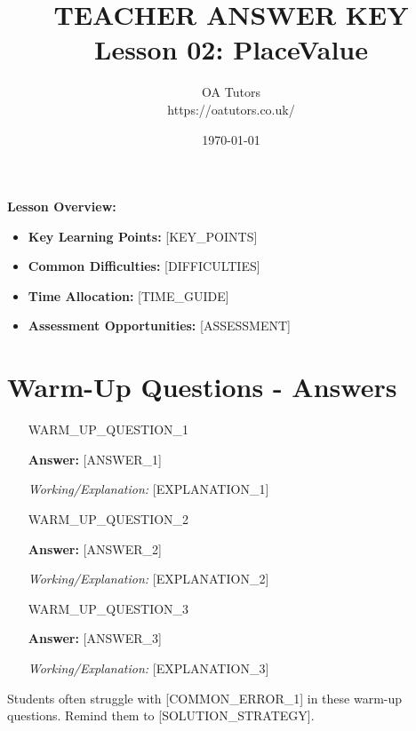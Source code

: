 \documentclass[a4paper,12pt]{article}
\begin{document}
\title{\textcolor{oared}{\Huge TEACHER ANSWER KEY} \\ 
       \textcolor{oablue}{\Large Lesson 02: PlaceValue}}
\author{\textcolor{oablue}{OA Tutors} \\ 
        \textcolor{oagray}{https://oatutors.co.uk/}}
\date{\textcolor{oagray}{\today}}

\maketitle

\begin{teachingtip}
\textbf{Lesson Overview:}
\begin{itemize}
    \item \textbf{Key Learning Points:} [KEY_POINTS]
    \item \textbf{Common Difficulties:} [DIFFICULTIES]
    \item \textbf{Time Allocation:} [TIME_GUIDE]
    \item \textbf{Assessment Opportunities:} [ASSESSMENT]
\end{itemize}
\end{teachingtip}

\section{Warm-Up Questions - Answers}

\begin{enumerate}
    \item [WARM_UP_QUESTION_1]
    
    \textcolor{oared}{\textbf{Answer:} [ANSWER_1]}
    
    \textit{Working/Explanation:} [EXPLANATION_1]
    
    \item [WARM_UP_QUESTION_2]
    
    \textcolor{oared}{\textbf{Answer:} [ANSWER_2]}
    
    \textit{Working/Explanation:} [EXPLANATION_2]
    
    \item [WARM_UP_QUESTION_3]
    
    \textcolor{oared}{\textbf{Answer:} [ANSWER_3]}
    
    \textit{Working/Explanation:} [EXPLANATION_3]
\end{enumerate}

\begin{commonerror}
Students often struggle with [COMMON_ERROR_1] in these warm-up questions. 
Remind them to [SOLUTION_STRATEGY].
\end{commonerror}
\end{document}
